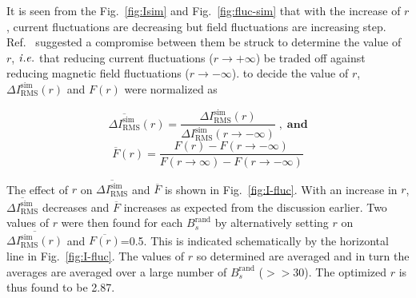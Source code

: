 
\FloatBarrier
It is seen from the Fig.~\ref{fig:Isim} and Fig.~\ref{fig:fluc-sim} that with the increase of $r$, current fluctuations are decreasing but field fluctuations are increasing step. Ref.~\cite{bea} suggested a compromise between them be struck to determine the value of $r$, $\it i.e.$ that reducing current fluctuations ($r \rightarrow + \infty$) be traded off against reducing magnetic field fluctuations ($r \rightarrow - \infty$). to decide the value of $r$, $\Delta I_{\text{RMS}}^{\text{sim}}(r)$ and $F(r)$ were normalized as

\begin{equation}\label{eq:Inorm}
    \overline{\Delta I_{\text{RMS}}^{\text{sim}}}(r)=\frac{\Delta I_{\text{RMS}}^{\text{sim}}(r)}{\Delta I_{\text{RMS}}^{\text{sim}}(r\rightarrow - \infty)} \;\mathbf{,\;and}
\end{equation}
\begin{equation}\label{eq:flucNorm}
    \overline{F}(r)=\frac{F(r)- F(r\rightarrow - \infty)}{F(r\rightarrow \infty)- F(r\rightarrow - \infty)}
\end{equation}


\FloatBarrier
The effect of $r$ on $\overline{\Delta I_{\text{RMS}}^{\text{sim}}}$ and $\overline{F}$ is shown in Fig.~\ref{fig:I-fluc}. With an increase in $r$, $\overline{\Delta I_{\text{RMS}}^{\text{sim}}}$ decreases and $\overline{F}$ increases as expected from the discussion earlier.
Two values of $r$ were then found for each $B_s^{\text{rand}}$ by alternatively setting $r$ on $\overline{\Delta I_{\text{RMS}}^{\text{sim}}(r)}$ and $\overline{F(r)}$=0.5. This is indicated schematically by the horizontal line in Fig.~\ref{fig:I-fluc}. The values of $r$ so determined are averaged and in turn the averages are averaged over a large number of $B_s^{\text{rand}}$ ($>>$30). The optimized $r$ is thus found to be 2.87.

